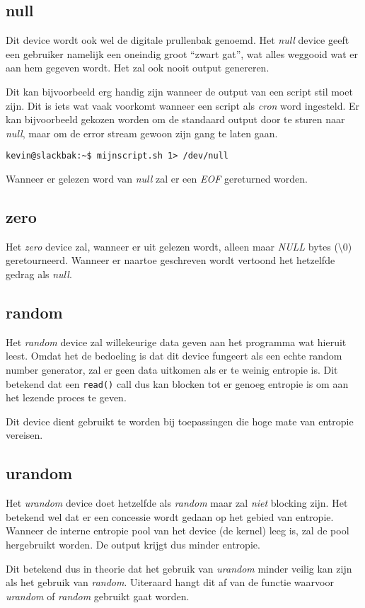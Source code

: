\subsection{null}
Dit device wordt ook wel de digitale prullenbak genoemd. Het \emph{null} device geeft een gebruiker namelijk een oneindig groot ``zwart gat'', wat alles weggooid wat er aan hem gegeven wordt. Het zal ook nooit output genereren. 

Dit kan bijvoorbeeld erg handig zijn wanneer de output van een script stil moet zijn. Dit is iets wat vaak voorkomt wanneer een script als \emph{cron} word ingesteld. Er kan bijvoorbeeld gekozen worden om de standaard output door te sturen naar \emph{null}, maar om de error stream gewoon zijn gang te laten gaan. 
\begin{lstlisting}
kevin@slackbak:~$ mijnscript.sh 1> /dev/null 
\end{lstlisting}%
Wanneer er gelezen word van \emph{null} zal er een \emph{EOF} gereturned worden. 

\subsection{zero}
Het \emph{zero} device zal, wanneer er uit gelezen wordt, alleen maar \emph{NULL} bytes (\textbackslash{}0) geretourneerd. Wanneer er naartoe geschreven wordt vertoond het hetzelfde gedrag als \emph{null}.

\subsection{random}
Het \emph{random} device zal willekeurige data geven aan het programma wat hieruit leest. Omdat het de bedoeling is dat dit device fungeert als een echte random number generator, zal er geen data uitkomen als er te weinig entropie is. Dit betekend dat een \texttt{read()} call dus kan blocken tot er genoeg entropie is om aan het lezende proces te geven.

Dit device dient gebruikt te worden bij toepassingen die hoge mate van entropie vereisen. 

\subsection{urandom}
Het \emph{urandom} device doet hetzelfde als \emph{random} maar zal \emph{niet} blocking zijn. Het betekend wel dat er een concessie wordt gedaan op het gebied van entropie. Wanneer de interne entropie pool van het device (de kernel) leeg is, zal de pool hergebruikt worden. De output krijgt dus minder entropie. 

Dit betekend dus in theorie dat het gebruik van \emph{urandom} minder veilig kan zijn als het gebruik van \emph{random}. Uiteraard hangt dit af van de functie waarvoor \emph{urandom} of \emph{random} gebruikt gaat worden.
